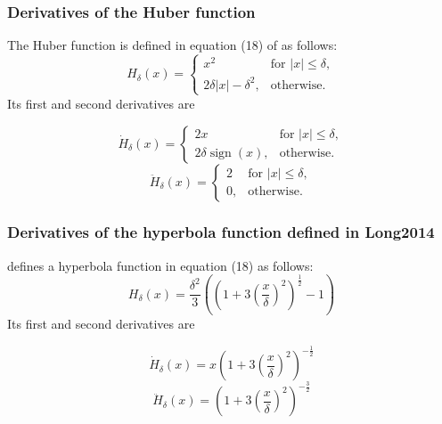 \documentclass[a4paper, 10pt]{article}
\DeclareMathOperator*{\sign}{sign}
\begin{document}
\subsubsection{Derivatives of the Huber function}
The Huber function is defined in equation (18) of \cite{cai_full-spectral_2013} as follows:
\begin{equation*}
H_\delta (x) = 	\begin{cases}
		  {x^2}                   & \text{for } |x| \le \delta, \\
		  2 \delta |x| -\delta^2, & \text{otherwise.}
		\end{cases}
\end{equation*}
Its first and second derivatives are
\begin{multicols}{2}
  \begin{equation*}
\dot{H}_\delta (x) = 	\begin{cases}
		  2x                   & \text{for } |x| \le \delta, \\
		  2 \delta \sign(x), & \text{otherwise.}
		\end{cases}
  \end{equation*}\break
  \begin{equation*}
\ddot{H}_\delta (x) = 	\begin{cases}
		  2                   & \text{for } |x| \le \delta, \\
		  0, & \text{otherwise.}
		\end{cases}
  \end{equation*}
\end{multicols}

\subsubsection{Derivatives of the hyperbola function defined in Long2014}
\cite{long_multi-material_2014} defines a hyperbola function in equation (18) as follows:
\begin{equation*}
H_\delta (x) = \frac{\delta^2}{3} \left( \left(1 + 3 \left(\frac{x}{\delta} \right)^2 \right)^{\frac{1}{2}} - 1 \right)
\end{equation*}
Its first and second derivatives are
\begin{multicols}{2}
  \begin{equation*}
\dot{H}_\delta (x) = x \left(1 + 3 \left(\frac{x}{\delta} \right)^2 \right)^{-\frac{1}{2}}
  \end{equation*}\break
  \begin{equation*}
\ddot{H}_\delta (x) = \left(1 + 3 \left(\frac{x}{\delta} \right)^2 \right)^{-\frac{3}{2}}
  \end{equation*}
\end{multicols}
\end{document}
